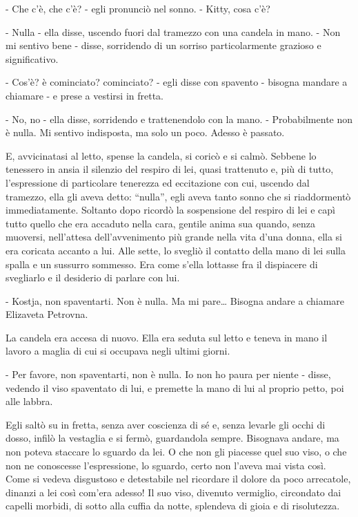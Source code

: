- Che c'è, che c'è? - egli pronunciò nel sonno. - Kitty, cosa c'è? 

- Nulla - ella disse, uscendo fuori dal tramezzo con una candela in mano. - Non mi sentivo bene - disse, sorridendo di un sorriso particolarmente grazioso e significativo. 

- Cos'è? è cominciato? cominciato? - egli disse con spavento - bisogna mandare a chiamare - e prese a vestirsi in fretta. 

- No, no - ella disse, sorridendo e trattenendolo con la mano. - Probabilmente non è nulla. Mi sentivo indisposta, ma solo un poco. Adesso è passato. 

E, avvicinatasi al letto, spense la candela, si coricò e si calmò. Sebbene lo tenessero in ansia il silenzio del respiro di lei, quasi trattenuto e, più di tutto, l'espressione di particolare tenerezza ed eccitazione con cui, uscendo dal tramezzo, ella gli aveva detto: ``nulla'', egli aveva tanto sonno che si riaddormentò immediatamente. Soltanto dopo ricordò la sospensione del respiro di lei e capì tutto quello che era accaduto nella cara, gentile anima sua quando, senza muoversi, nell'attesa dell'avvenimento più grande nella vita d'una donna, ella si era coricata accanto a lui. Alle sette, lo svegliò il contatto della mano di lei sulla spalla e un sussurro sommesso. Era come s'ella lottasse fra il dispiacere di svegliarlo e il desiderio di parlare con lui. 

- Kostja, non spaventarti. Non è nulla. Ma mi pare\ldots{} Bisogna andare a chiamare Elizaveta Petrovna. 

La candela era accesa di nuovo. Ella era seduta sul letto e teneva in mano il lavoro a maglia di cui si occupava negli ultimi giorni. 

- Per favore, non spaventarti, non è nulla. Io non ho paura per niente - disse, vedendo il viso spaventato di lui, e premette la mano di lui al proprio petto, poi alle labbra. 

Egli saltò su in fretta, senza aver coscienza di sé e, senza levarle gli occhi di dosso, infilò la vestaglia e si fermò, guardandola sempre. Bisognava andare, ma non poteva staccare lo sguardo da lei. O che non gli piacesse quel suo viso, o che non ne conoscesse l'espressione, lo sguardo, certo non l'aveva mai vista così. Come si vedeva disgustoso e detestabile nel ricordare il dolore da poco arrecatole, dinanzi a lei così com'era adesso! Il suo viso, divenuto vermiglio, circondato dai capelli morbidi, di sotto alla cuffia da notte, splendeva di gioia e di risolutezza. 

